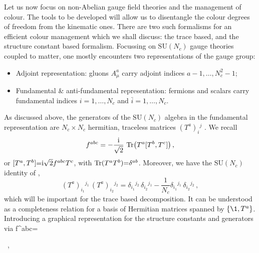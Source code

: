 Let us now focus on non-Abelian gauge field theories and the management of colour. The tools
to be developed will allow us to disentangle the colour degrees of freedom from the kinematic ones. There are two such formalisms for an efficient colour management which we shall discuss: the trace based, and the structure constant based formalism. Focussing on $\text{SU}(N_c)$ gauge theories coupled to matter, one mostly 
encounters two representations of
the gauge group: 
\begin{itemize}
    \item {Adjoint representation:} gluons $A^a_\mu$  carry
    adjoint indices $a-1,\ldots,N^2_c-1$;
 \smallskip
    \item {Fundamental \& anti-fundamental representation:} fermions and scalars carry fundamental indices
    $i=1,\ldots, N_c$ and $\bar i=1,\ldots , N_c$.
\end{itemize}
As discussed above, the generators of the $\text{SU}(N_c)$ algebra in the fundamental 
representation are $N_c\!\times\!N_c$ hermitian, traceless
 matrices $(T^a)_i{}^{{j}}$ . 
 We recall 
\begin{equation}
\label{fasTr}
    f^{abc}=-\frac{\mathrm{i}}{\sqrt{2}} \, \mathop{\mathrm{Tr}} \bigl(T^a [T^b, T^c] \bigr)\, , 
\end{equation}
or $[T^a, T^b] {=} \mathrm{i}\sqrt{2} f^{abc} T^c$, with $\mathop{\mathrm{Tr}}(T^a T^b){=}\delta^{ab}$. 
Moreover, we have the $\text{SU}(N_c)$ identity of ,
\begin{equation}
\label{SUNFierz}
 (T^a)_{i_1}{}^{{j}_1}\,  (T^a)_{i_2}{}^{{j}_2}= \delta_{i_1}{}^{{j}_2}\,
\delta_{i_2}{}^{{j}_1} - \frac{1}{N_c}\delta_{i_1}{}^{{j}_1}\,
\delta_{i_2}{}^{{j}_2} \, ,
\end{equation}
which will be important for the trace based decomposition.
It can be understood as a completeness relation for a basis of Hermitian matrices spanned
by $\{\1, T^a\}$. Introducing a graphical representation for the structure constants
and generators via
\be
\label{Tagraphical}
f^{abc}=
   \, ,
